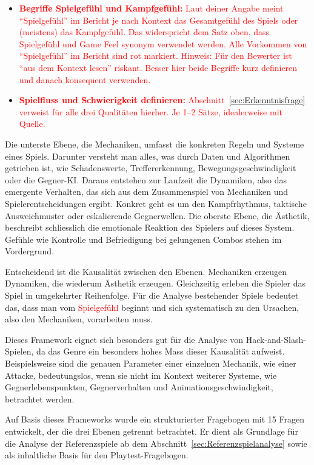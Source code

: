 \documentclass[../Main.tex]{subfiles}
\begin{document}
\begin{itemize}[leftmargin=1.5cm]
    \item \textcolor{red}{\textbf{Begriffe Spielgefühl und Kampfgefühl:} Laut deiner Angabe meint \enquote{Spielgefühl} im Bericht je nach Kontext das Gesamtgefühl des Spiels oder (meistens) das Kampfgefühl. Das widerspricht dem Satz oben, dass Spielgefühl und Game Feel synonym verwendet werden. Alle Vorkommen von \enquote{Spielgefühl} im Bericht sind rot markiert. Hinweis: Für den Bewerter ist \enquote{aus dem Kontext lesen} riskant. Besser hier beide Begriffe kurz definieren und danach konsequent verwenden.}
    \item \textcolor{red}{\textbf{Spielfluss und Schwierigkeit definieren:} Abschnitt~\ref{sec:Erkenntnisfrage} verweist für alle drei Qualitäten hierher. Je 1--2 Sätze, idealerweise mit Quelle.}
\end{itemize}

Die unterste Ebene, die Mechaniken, umfasst die konkreten Regeln und Systeme eines Spiels. Darunter versteht man alles, was durch Daten und Algorithmen getrieben ist, wie Schadenswerte, Treffererkennung, Bewegungsgeschwindigkeit oder die Gegner-KI. Daraus entstehen zur Laufzeit die Dynamiken, also das emergente Verhalten, das sich aus dem Zusammenspiel von Mechaniken und Spielerentscheidungen ergibt. Konkret geht es um den Kampfrhythmus, taktische Ausweichmuster oder eskalierende Gegnerwellen. Die oberste Ebene, die Ästhetik, beschreibt schliesslich die emotionale Reaktion des Spielers auf dieses System. Gefühle wie Kontrolle und Befriedigung bei gelungenen Combos stehen im Vordergrund.

Entscheidend ist die Kausalität zwischen den Ebenen. Mechaniken erzeugen Dynamiken, die wiederum Ästhetik erzeugen. Gleichzeitig erleben die Spieler das Spiel in umgekehrter Reihenfolge. Für die Analyse bestehender Spiele bedeutet das, dass man vom \textcolor{red}{Spielgefühl} beginnt und sich systematisch zu den Ursachen, also den Mechaniken, vorarbeiten muss.

Dieses Framework eignet sich besonders gut für die Analyse von Hack-and-Slash-Spielen, da das Genre ein besonders hohes Mass dieser Kausalität aufweist. Beispielsweise sind die genauen Parameter einer einzelnen Mechanik, wie einer Attacke, bedeutungslos, wenn sie nicht im Kontext weiterer Systeme, wie Gegnerlebenspunkten, Gegnerverhalten und Animationsgeschwindigkeit, betrachtet werden.\autocite{hunicke2004mda}

Auf Basis dieses Frameworks wurde ein strukturierter Fragebogen mit 15 Fragen entwickelt, der die drei Ebenen getrennt betrachtet. Er dient als Grundlage für die Analyse der Referenzspiele ab dem Abschnitt~\ref{sec:Referenzspielanalyse} sowie als inhaltliche Basis für den Playtest-Fragebogen.
\end{document}
